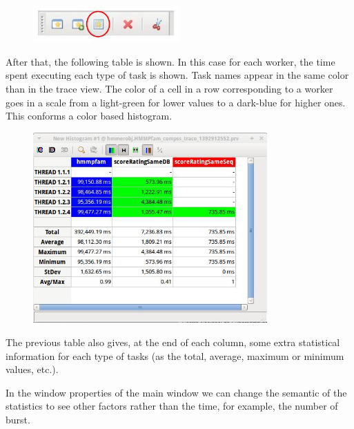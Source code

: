 \begin{figure}[ht!]
  \centering
    \includegraphics[width=0.5\textwidth]{./Sections/7_Tracing/Figures/12.jpeg}
\end{figure}

After that, the following table is shown. In this case for each worker, the time spent executing each type of task is shown. Task names appear in the same color than in the trace view. The color of a cell in a row corresponding to a worker goes in a scale from a light-green for lower values to a dark-blue for higher ones. This conforms a color based histogram.

\begin{figure}[ht!]
  \centering
    \includegraphics[width=0.8\textwidth]{./Sections/7_Tracing/Figures/13.jpeg}
\end{figure}
 
The previous table also gives, at the end of each column, some extra statistical information for each type of tasks (as the total, average, maximum or minimum values, etc.).

In the window properties of the main window we can change the semantic of the statistics to see other factors rather than the time, for example, the number of burst.


